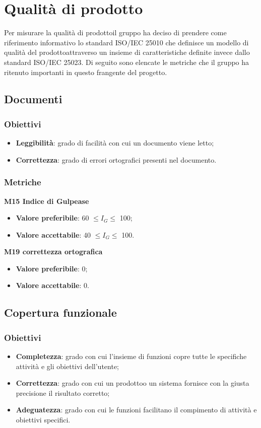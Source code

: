 \section{Qualità di prodotto}
    Per misurare la qualità di prodotto\glosp il gruppo ha deciso di prendere come riferimento informativo lo standard ISO/IEC 25010 che definisce un modello di qualità del prodotto\glosp attraverso un insieme di caratteristiche definite invece dallo standard ISO/IEC 25023. Di seguito sono elencate le metriche che il gruppo ha ritenuto importanti in questo frangente del progetto\glo.
    \subsection{Documenti}
    	\subsubsection{Obiettivi}
    		\begin{itemize}
    			\item \textbf{Leggibilità}: grado di facilità con cui un documento viene letto;
    			\item \textbf{Correttezza}: grado di errori ortografici presenti nel documento.
    		\end{itemize}
	    \subsubsection{Metriche}
	    \textbf{M15 Indice di Gulpease}
	    \begin{itemize}
	    	\item \textbf{Valore preferibile}: 60 $\le I_{G} \le$ 100;
	    	\item \textbf{Valore accettabile}: 40 $\le I_{G} \le$ 100.
	    \end{itemize}
	    \textbf{M19 correttezza ortografica}
	    \begin{itemize}
	    	\item \textbf{Valore preferibile}: 0;
	    	\item \textbf{Valore accettabile}: 0.
	    \end{itemize}
    \subsection{Copertura funzionale}
        \subsubsection{Obiettivi}
            \begin{itemize}
                \item \textbf{Completezza}: grado con cui l'insieme di funzioni copre tutte le specifiche attività e gli obiettivi dell'utente;
                \item \textbf{Correttezza}: grado con cui un prodotto\glosp o un sistema fornisce con la giusta precisione il risultato corretto;
                \item \textbf{Adeguatezza}: grado con cui le funzioni facilitano il compimento di attività e obiettivi specifici.
            \end{itemize}
